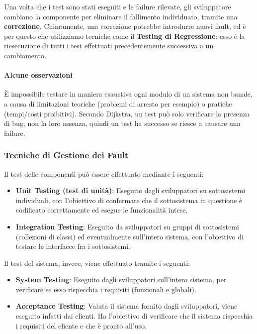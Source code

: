             \vspace{1mm}
            Una volta che i test sono stati eseguiti e le failure rilevate, gli sviluppatore cambiano la componente per eliminare il fallimento individuato, tramite una \textbf{correzione}. Chiaramente, una correzione potrebbe introdurre nuovi fault, ed è per questo che utilizziamo tecniche come il \textbf{Testing di Regressione}: esso è la riesecuzione di tutti i test effettuati precedentemente successiva a un cambiamento.
            
            \paragraph{Alcune osservazioni} È impossibile testare in maniera esaustiva ogni modulo di un sistema non banale, a causa di limitazioni teoriche (problemi di arresto per esempio) o pratiche (tempi/costi proibitivi). Secondo Dijkstra, un test può solo verificare la presenza di bug, non la loro assenza, quindi un test ha successo se riesce a causare una failure.
            
            \subsubsection{Tecniche di Gestione dei Fault}
            Il test delle componenti può essere effettuato mediante i seguenti:
            \begin{itemize}
                \item \textbf{Unit Testing (test di unità)}: Eseguito dagli sviluppatori su sottosistemi individuali, con l'obiettivo di confermare che il sottosistema in questione è codificato correttamente ed esegue le funzionalità intese.
                \item \textbf{Integration Testing}: Eseguito da sviluppatori su gruppi di sottosistemi (collezioni di classi) ed eventualmente sull'intero sistema, con l'obiettivo di testare le interfacce fra i sottosistemi. 
            \end{itemize}
            
            Il test del sistema, invece, viene effettuato tramite i seguenti:
            \begin{itemize}
                \item \textbf{System Testing}: Eseguito dagli sviluppatori sull'intero sistema, per verificare se esso rispecchia i requisiti (funzionali e globali).
                \item \textbf{Acceptance Testing}: Valuta il sistema fornito dagli sviluppatori, viene eseguito infatti dai clienti. Ha l'obiettivo di verificare che il sistema rispecchia i requisiti del cliente e che è pronto all'uso.
            \end{itemize}
            
